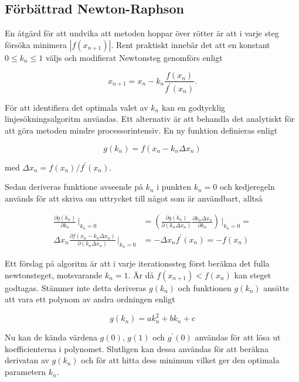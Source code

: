 \subsection{Förbättrad Newton-Raphson}

En åtgärd för att undvika att metoden hoppar över rötter är att i varje steg försöka minimera $|f(x_{n+1})|$.
Rent praktiskt innebär det att en konstant $0 \le k_n \le 1$ väljs och modifierat
Newtonsteg genomförs enligt

\begin{equation}
\label{eq:newtonmodified}
x_{n+1} = x_n - k_n\frac{f(x_n)}{f^\prime(x_n)}.
\end{equation}

För att identifiera det optimala valet av $k_n$ kan en godtycklig linje\-söknings\-algoritm användas. Ett alternativ
är att behandla det analytiskt för att göra metoden mindre processor\-intensiv. En ny funktion definieras
enligt 

\begin{equation}
\label{eq:newtong}
g(k_n) = f(x_n- k_n\Delta x_n)
\end{equation}

med $\Delta x_n = f(x_n)/f^\prime(x_n)$.

Sedan deriveras funktione avseende på $k_n$ i punkten $k_n=0$
och kedjeregeln används för att skriva om uttrycket till något som är användbart, alltså

\begin{align}
\frac{\partial g(k_n)}{\partial k_n}\,\bigg|_{k_n=0} & = 
\left(\frac{\partial g(k_n)}{\partial (k_n\Delta x_n)}
\frac{\partial k_n \Delta x_n}{\partial k_n}\right)\,\bigg|_{k_n=0} = \nonumber \\
\Delta x_n \frac{\partial f(x_n- k_n\Delta x_n)}{\partial (k_n\Delta x_n)}\,\bigg|_{k_n=0} & = 
-\Delta x_n f^\prime(x_n) = - f(x_n)
\label{eq:newtongmin}
\end{align}

Ett förslag på algoritm är att i varje iterations\-steg först beräkna det fulla newtonsteget, motsvarande $k_n=1$.
Är då $f(x_{n+1}) < f(x_n)$ kan steget godtagas. Stämmer inte detta deriveras $g(k_n)$ och funktionen $g(k_n)$ ansätts att vara ett polynom av andra ordningen enligt

\begin{equation}
\label{eq:newtonfit}
g(k_n) = ak^2_n + bk_n + c
\end{equation}

Nu kan de kända värdena $g(0)$, $g(1)$ och $g^\prime(0)$ användas för att lösa ut koefficienterna i polynomet.
Slutligen kan dessa användas för att beräkna derivatan av $g(k_n)$ och för att hitta dess minimum vilket ger den optimala parametern $k_n$.

